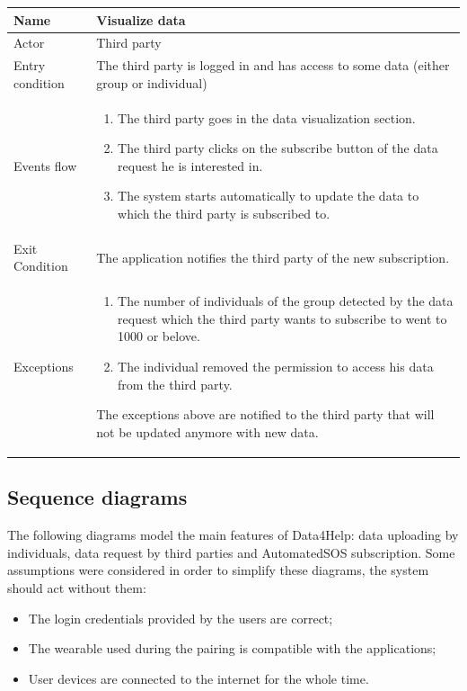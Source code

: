 \begin{table}[H]
\centering
\begin{tabular}{|l|p{11cm}|}
    \hline
    Name & Visualize data
    \\ \hline
    Actor & Third party
    \\ \hline 
    Entry condition & The third party is logged in and has access to some data (either group or individual)
        \\ \hline
    Events flow &
    \begin{enumerate}
    \item The third party goes in the data visualization section.
	\item The third party clicks on the subscribe button of the data request he is interested in.
	\item The system starts automatically to update the data to which the third party is subscribed to.
    \end{enumerate}
     \\ \hline
     Exit Condition & The application notifies the third party of the new subscription.
     \\
    \hline
    Exceptions &
        \begin{enumerate}
    \item The number of individuals of the group detected by the data request which the third party wants to subscribe to went to 1000 or belove.
    \item The individual removed the permission to access his data from the third party.
\end{enumerate}  
 The exceptions above are notified to the third party that will not be updated anymore with new data.
  \\
    \hline
\end{tabular}
\end{table}



\subsection{Sequence diagrams}
The following diagrams model the main features of Data4Help: data uploading by individuals, data request by third parties and AutomatedSOS subscription.
Some assumptions were considered in order to simplify these diagrams, the system should act without them:
\begin{itemize}
\item The login credentials provided by the users are correct;
\item The wearable used during the pairing is compatible with the applications;
\item User devices are connected to the internet for the whole time.
\end{itemize}





